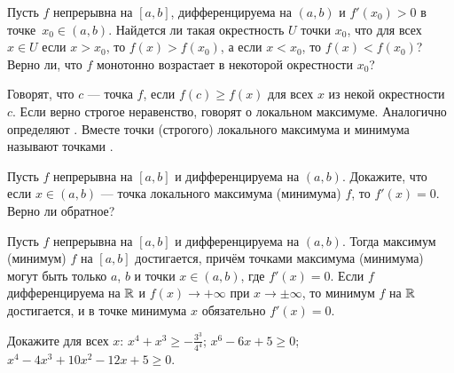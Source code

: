 \documentclass[a4paper, 12pt]{article}
\begin{document}





Пусть $f$
непрерывна на $[a,b]$, дифференцируема на $(a,b)$
и $f'(x_0)>0$ в точке~\hbox{$x_0\in (a,b)$.}
 Найдется ли такая окрестность $U$ точки $x_0$, что
для всех \hbox{$x\in U$} если $x>x_0$, то
$f(x)>f(x_0)$, а если $x<x_0$, то $f(x)<f(x_0)$?
 Верно ли, что $f$ монотонно
возрастает в некоторой окрестности $x_0$?


 Говорят, что $c$ --- точка  $f$,
если $f(c)\ge f(x)$ для всех $x$ из некой окрестности $c$.
Если верно строгое неравенство, говорят о  локальном максимуме.
Аналогично определяют .
Вместе точки (строгого) локального максимума и минимума называют точками .


   Пусть $f$
непрерывна на $[a,b]$  и дифференцируема на $(a,b)$.
Докажите, что если $x\in (a,b)$ --- точка локального
максимума (минимума) $f$, то $f'(x)=0$.  Верно ли обратное?

 Пусть $f$ непрерывна на $[a,b]$ и дифференцируема на $(a,b)$. Тогда максимум (минимум) $f$ на $[a,b]$ достигается, причём точками максимума (минимума) могут быть только $a$, $b$ и точки $x\in(a,b)$, где $f'(x)=0$.  Если $f$ дифференцируема на $\mathbb{R}$ и $f(x)\rightarrow+\infty$ при $x\rightarrow\pm\infty$, то минимум $f$ на $\mathbb{R}$ достигается, и в точке минимума $x$ обязательно $f'(x)=0$.


 Докажите для всех $x$:
\label{ex}
 $x^4+x^3\ge -\frac{3^3}{4^4}$;
 $x^6-6x+5\ge 0$;
 $x^4-4x^3+10x^2-12x+5\ge 0$.


\end{document}
